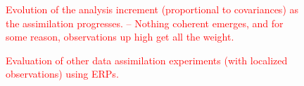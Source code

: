 \documentclass[draft,jgrga]{agutex}
\begin{document}
 \begin{figure}
 \caption{\textcolor{red}{Evolution of the analysis increment (proportional to covariances) as the assimilation progresses. -- Nothing coherent emerges, and for some reason, observations up high get all the weight.}}
 \label{fig:increment}
\end{figure}

 \begin{figure}
 \caption{\textcolor{red}{Evaluation of other data assimilation experiments (with localized observations) using ERPs.}}
 \label{fig:increment}
\end{figure}


%
%
%
%
%

\end{document}
